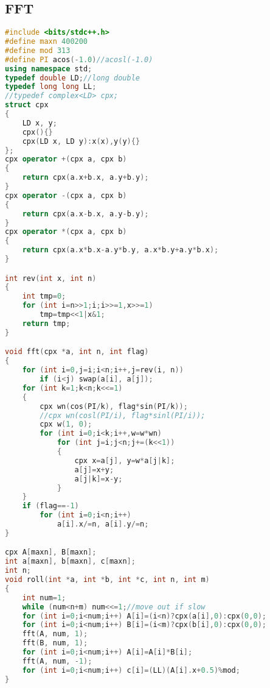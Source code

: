 \subsection{FFT}
\begin{lstlisting}[language=C++]
#include <bits/stdc++.h>
#define maxn 400200
#define mod 313
#define PI acos(-1.0)//acosl(-1.0)
using namespace std;
typedef double LD;//long double
typedef long long LL;
//typedef complex<LD> cpx;
struct cpx
{
	LD x, y;
	cpx(){}
	cpx(LD x, LD y):x(x),y(y){}
};
cpx operator +(cpx a, cpx b)
{
	return cpx(a.x+b.x, a.y+b.y);
}
cpx operator -(cpx a, cpx b)
{
	return cpx(a.x-b.x, a.y-b.y);
}
cpx operator *(cpx a, cpx b)
{
	return cpx(a.x*b.x-a.y*b.y, a.x*b.y+a.y*b.x);
}

int rev(int x, int n)
{
    int tmp=0;
    for (int i=n>>1;i;i>>=1,x>>=1)
        tmp=tmp<<1|x&1;
    return tmp;
}

void fft(cpx *a, int n, int flag)
{
	for (int i=0,j=i;i<n;i++,j=rev(i, n))
		if (i<j) swap(a[i], a[j]);
	for (int k=1;k<n;k<<=1)
	{
		cpx wn(cos(PI/k), flag*sin(PI/k));
		//cpx wn(cosl(PI/i), flag*sinl(PI/i));
		cpx w(1, 0);
		for (int i=0;i<k;i++,w=w*wn)
			for (int j=i;j<n;j+=(k<<1))
			{
				cpx x=a[j], y=w*a[j|k];
				a[j]=x+y;
				a[j|k]=x-y;
			}
	}
	if (flag==-1) 
		for (int i=0;i<n;i++)
			a[i].x/=n, a[i].y/=n;
}

cpx A[maxn], B[maxn];
int a[maxn], b[maxn], c[maxn];
int n;
void roll(int *a, int *b, int *c, int n, int m)
{
	int num=1;
	while (num<n+m) num<<=1;//move out if slow
	for (int i=0;i<num;i++) A[i]=(i<n)?cpx(a[i],0):cpx(0,0);
	for (int i=0;i<num;i++) B[i]=(i<m)?cpx(b[i],0):cpx(0,0);	
	fft(A, num, 1);
	fft(B, num, 1);
	for (int i=0;i<num;i++) A[i]=A[i]*B[i];
	fft(A, num, -1);
	for (int i=0;i<num;i++) c[i]=(LL)(A[i].x+0.5)%mod;
}
\end{lstlisting}
